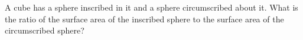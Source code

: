A cube has a sphere inscribed in it and a sphere circumscribed about it. What is the ratio of the surface area of the inscribed sphere to the surface area of the circumscribed sphere?
